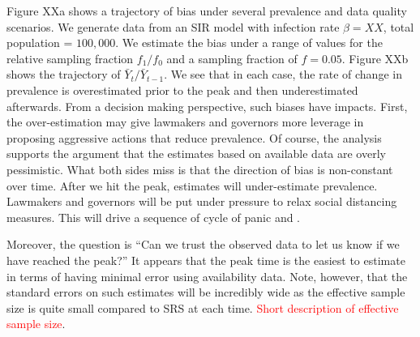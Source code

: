 \documentclass[aoas]{amsart}
\begin{document}
Figure XXa shows a trajectory of bias under several prevalence and data quality scenarios.  We generate data from an SIR model with infection rate $\beta = XX$, total population = $100,000$.  We estimate the bias under a range of values for the relative sampling fraction $f_1/f_0$ and a sampling fraction of $f = 0.05$.  Figure XXb shows the trajectory of $\bar Y_t / \bar Y_{t-1}$.  We see that in each case, the rate of change in prevalence is overestimated prior to the peak and then underestimated afterwards.  From a decision making perspective, such biases have impacts.  First, the over-estimation may give lawmakers and governors more leverage in proposing aggressive actions that reduce prevalence.  Of course, the analysis supports the argument that the estimates based on available data are overly pessimistic. What both sides miss is that the direction of bias is non-constant over time.  After we hit the peak, estimates will under-estimate prevalence.  Lawmakers and governors will be put under pressure to relax social distancing measures.  This will drive a sequence of cycle of panic and .

Moreover, the question is ``Can we trust the observed data to let us know if we have reached the peak?''  It appears that the peak time is the easiest to estimate in terms of having minimal error using availability data.  Note, however, that the standard errors on such estimates will be incredibly wide as the effective sample size is quite small compared to SRS at each time.  \textcolor{red}{Short description of effective sample size}.
\end{document}

